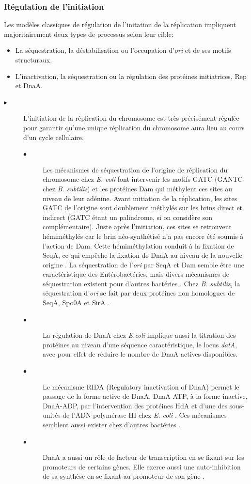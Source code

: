 \subsubsection{Régulation de l'initiation}
	Les modèles classiques de régulation de l'initation de la réplication impliquent majoritairement deux types de processus selon leur cible:
\begin{itemize}
	\item La séquestration, la déstabilisation ou l'occupation d'\textit{ori} et de ses motifs structuraux.
	\item L'inactivation, la séquestration ou la régulation des protéines initiatrices, Rep et DnaA.
\end{itemize}

\begin{description}
\item[$\blacktriangleright$] L'initiation de la réplication du chromosome est très précisément régulée pour garantir qu'une unique réplication du chromosome aura lieu au cours d'un cycle cellulaire.
	\begin{description} 
		\item[$\bullet$] Les mécanismes de séquestration de l'origine de réplication du chromosome chez \textit{E. coli} font intervenir les motifs GATC (GANTC chez \textit{B. subtilis}) et les protéines Dam qui méthylent ces sites au niveau de leur adénine. Avant initiation de la réplication, les sites GATC de l'origine sont doublement méthylés sur les brins direct et indirect (GATC étant un palindrome, si on considère son complémentaire). Juste après l'initiation, ces sites se retrouvent hémiméthylés car le brin néo-synthétisé n'a pas encore été soumis à l'action de Dam. Cette hémiméthylation conduit à la fixation de SeqA, ce qui empêche la fixation de DnaA au niveau de la nouvelle origine \citep{Mott2007,Kruger2004}. La séquestration de l'\textit{ori} par SeqA et Dam semble être une caractéristique des Entérobactéries, mais divers mécanismes de séquestration existent pour d'autres bactéries \citep{zakrzewska2007regulation}. Chez \textit{B. subtilis}, la séquestration d'\textit{ori} se fait par deux protéines non homologues de SeqA, Spo0A et SirA \citep{Katayama2010}.
		\item[$\bullet$]  La régulation de DnaA chez \textit{E.coli} implique aussi la titration des protéines au niveau d'une séquence caractéristique, le locus \textit{datA}, avec pour effet de réduire le nombre de DnaA actives disponibles.
		\item[$\bullet$]  Le mécanisme RIDA (Regulatory inactivation of DnaA) \citep{Mott2007} permet le passage de la forme active de DnaA, DnaA-ATP, à la forme inactive, DnaA-ADP, par l'intervention des protéines HdA et d'une des sous-unités de l'ADN polymérase III chez \textit{E. coli} \citep{Katayama2010}. Ces mécanismes semblent aussi exister chez d'autres bactéries \citep{zakrzewska2007regulation}.
		\item[$\bullet$]  DnaA a aussi un rôle de facteur de transcription en se fixant sur les promoteurs de certains gènes. Elle exerce aussi une auto-inhibition de sa synthèse en se fixant au promoteur de son gène \citep{zakrzewska2007regulation}.
	\end{description}
	

\end{description}
